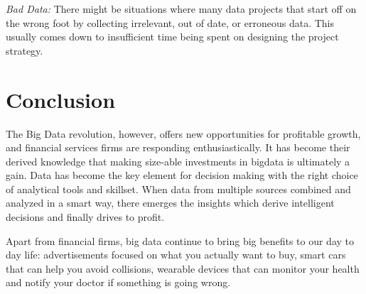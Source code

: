 \documentclass[sigconf]{acmart}
\begin{document}
\textit{Bad Data:} There might be situations where many data projects that start off on the wrong foot by collecting irrelevant, out of date, or erroneous data. This usually comes down to insufficient time being spent on designing the project strategy.\cite{5risks-bigdata}


\section{Conclusion}
The Big Data revolution, however, offers new opportunities
for profitable growth, and financial services firms are responding enthusiastically. It has become their derived knowledge that making size-able investments in bigdata is ultimately a gain. Data has become the key element for decision making with the right choice of analytical tools and skillset. When data from multiple sources combined and analyzed in a smart way, there emerges the insights which derive intelligent decisions and finally drives to profit.

Apart from financial firms, big data continue to bring big benefits to our day to day life: advertisements focused on what you actually want to buy, smart cars that can help you avoid collisions, wearable devices that can monitor your health and notify your doctor if something is going wrong. 



 
\end{document}
